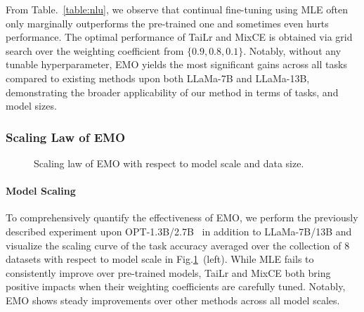 From Table.~\ref{table:nlu}, we observe that continual fine-tuning using MLE often only marginally outperforms the pre-trained one and sometimes even hurts 
performance. The optimal performance of TaiLr and MixCE is obtained via grid search over the weighting coefficient from $\{0.9,0.8,0.1\}$. Notably, without any tunable hyperparameter, EMO yields the most significant gains across all tasks compared to existing methods upon both LLaMa-7B and LLaMa-13B, demonstrating the broader applicability of our method in terms of 
tasks, and model sizes.

\subsubsection{Scaling Law of EMO}
\begin{figure}[h]
    \centering
    \caption{Scaling law of EMO with respect to model scale and data size.}
    \label{fig:scaling}
\end{figure}

\paragraph{Model Scaling} To comprehensively quantify the effectiveness of EMO, we perform the previously described experiment upon OPT-1.3B/2.7B~\citep{opt} in addition to LLaMa-7B/13B and visualize the scaling curve of the task accuracy averaged over the collection of 8 datasets with respect to model scale in Fig.\ref{fig:scaling}~(left). While MLE fails to consistently improve over pre-trained models, TaiLr and MixCE both bring positive impacts when their weighting coefficients are carefully tuned. Notably, EMO shows steady improvements over other methods across all model scales.
